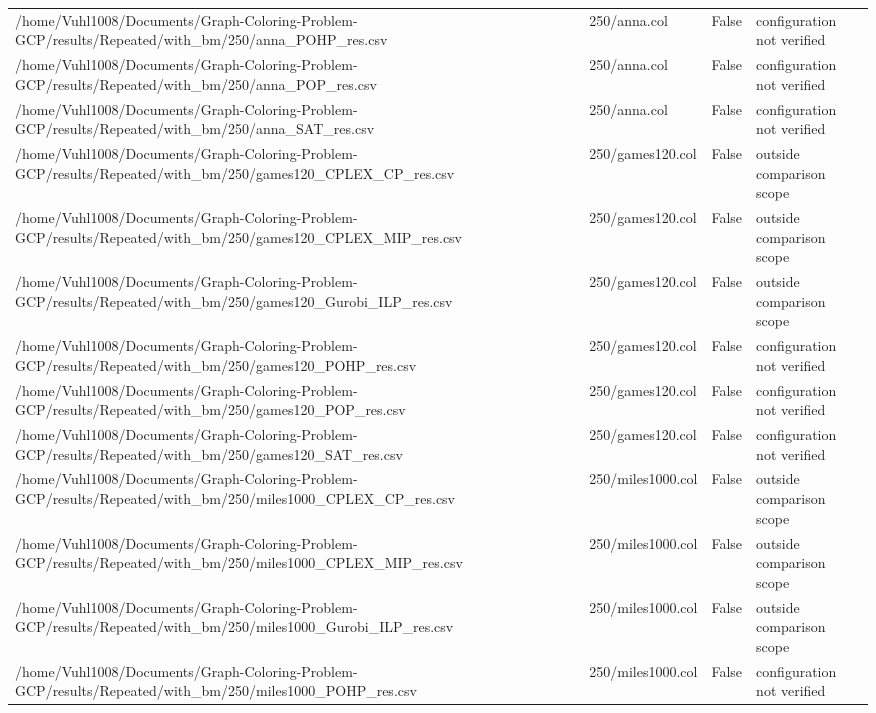 \begin{table}[htbp]
\begin{tabular}{llll}
/home/Vuhl1008/Documents/Graph-Coloring-Problem-GCP/results/Repeated/with\_bm/250/anna\_POHP\_res.csv & 250/anna.col & False & configuration not verified \\
/home/Vuhl1008/Documents/Graph-Coloring-Problem-GCP/results/Repeated/with\_bm/250/anna\_POP\_res.csv & 250/anna.col & False & configuration not verified \\
/home/Vuhl1008/Documents/Graph-Coloring-Problem-GCP/results/Repeated/with\_bm/250/anna\_SAT\_res.csv & 250/anna.col & False & configuration not verified \\
/home/Vuhl1008/Documents/Graph-Coloring-Problem-GCP/results/Repeated/with\_bm/250/games120\_CPLEX\_CP\_res.csv & 250/games120.col & False & outside comparison scope \\
/home/Vuhl1008/Documents/Graph-Coloring-Problem-GCP/results/Repeated/with\_bm/250/games120\_CPLEX\_MIP\_res.csv & 250/games120.col & False & outside comparison scope \\
/home/Vuhl1008/Documents/Graph-Coloring-Problem-GCP/results/Repeated/with\_bm/250/games120\_Gurobi\_ILP\_res.csv & 250/games120.col & False & outside comparison scope \\
/home/Vuhl1008/Documents/Graph-Coloring-Problem-GCP/results/Repeated/with\_bm/250/games120\_POHP\_res.csv & 250/games120.col & False & configuration not verified \\
/home/Vuhl1008/Documents/Graph-Coloring-Problem-GCP/results/Repeated/with\_bm/250/games120\_POP\_res.csv & 250/games120.col & False & configuration not verified \\
/home/Vuhl1008/Documents/Graph-Coloring-Problem-GCP/results/Repeated/with\_bm/250/games120\_SAT\_res.csv & 250/games120.col & False & configuration not verified \\
/home/Vuhl1008/Documents/Graph-Coloring-Problem-GCP/results/Repeated/with\_bm/250/miles1000\_CPLEX\_CP\_res.csv & 250/miles1000.col & False & outside comparison scope \\
/home/Vuhl1008/Documents/Graph-Coloring-Problem-GCP/results/Repeated/with\_bm/250/miles1000\_CPLEX\_MIP\_res.csv & 250/miles1000.col & False & outside comparison scope \\
/home/Vuhl1008/Documents/Graph-Coloring-Problem-GCP/results/Repeated/with\_bm/250/miles1000\_Gurobi\_ILP\_res.csv & 250/miles1000.col & False & outside comparison scope \\
/home/Vuhl1008/Documents/Graph-Coloring-Problem-GCP/results/Repeated/with\_bm/250/miles1000\_POHP\_res.csv & 250/miles1000.col & False & configuration not verified \\

\end{tabular}
\end{table}
